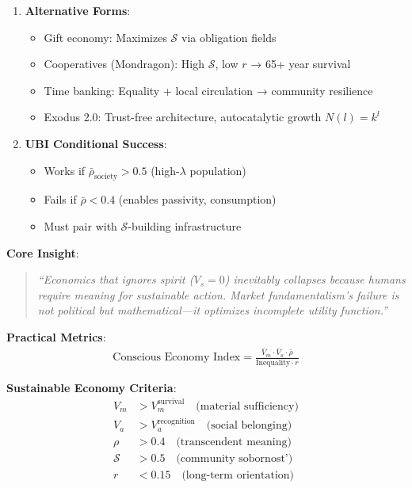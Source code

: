 \documentclass[11pt,a4paper]{article}
\theoremstyle{definition}
\theoremstyle{remark}
\begin{document}
\begin{enumerate}
\begin{mdframed}[backgroundcolor=green!10,linewidth=2pt,linecolor=green!70!black]
\begin{enumerate}[nosep]
    \item \textbf{Alternative Forms}:
        \begin{itemize}[nosep]
            \item Gift economy: Maximizes \(\mathcal{S}\) via obligation fields
            \item Cooperatives (Mondragon): High \(\mathcal{S}\), low \(r\) → 65+ year survival
            \item Time banking: Equality + local circulation → community resilience
            \item Exodus 2.0: Trust-free architecture, autocatalytic growth \(N(l) = k^l\)
        \end{itemize}
    
\item \textbf{UBI Conditional Success}:
        \begin{itemize}[nosep]
            \item Works if \(\bar{\rho}_{\text{society}} > 0.5\) (high-\(\lambda\) population)
            \item Fails if \(\bar{\rho} < 0.4\) (enables passivity, consumption)
            \item Must pair with \(\mathcal{S}\)-building infrastructure
        \end{itemize}
\end{enumerate}

\textbf{Core Insight}:
\begin{quote}
\textit{``Economics that ignores spirit (\(V_s = 0\)) inevitably collapses because humans require meaning for sustainable action. Market fundamentalism's failure is not political but mathematical—it optimizes incomplete utility function.''}
\end{quote}

\textbf{Practical Metrics}:
\begin{align}
\text{Conscious Economy Index} = \frac{\bar{V}_m \cdot \bar{V}_a \cdot \bar{\rho}}{\text{Inequality} \cdot r}
\end{align}

\textbf{Sustainable Economy Criteria}:
\begin{align}
V_m &> V_m^{\text{survival}} \quad \text{(material sufficiency)} \\
V_a &> V_a^{\text{recognition}} \quad \text{(social belonging)} \\
\rho &> 0.4 \quad \text{(transcendent meaning)} \\
\mathcal{S} &> 0.5 \quad \text{(community sobornost')} \\
r &< 0.15 \quad \text{(long-term orientation)}
\end{align}


\end{mdframed}
\end{enumerate}
\end{document}
